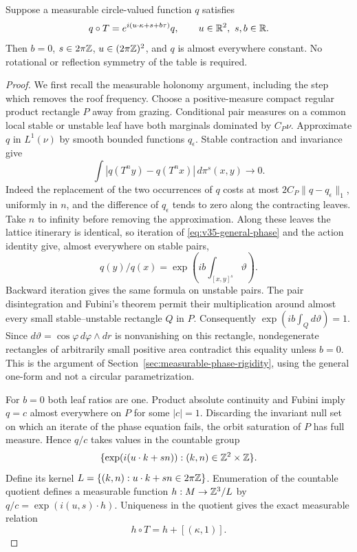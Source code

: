 \begin{theorem}
\label{thm:v35-rotation-free-rigidity}
Suppose a measurable circle-valued function $q$ satisfies
\begin{equation}\label{eq:v35-general-phase}
 q\circ T=e^{i(u\cdot\kappa+s+b\tau)}q,
       \qquad u\in\R^2,\ s,b\in\R.
\end{equation}
Then $b=0$, $s\in2\pi\mathbb Z$, $u\in(2\pi\mathbb Z)^2$, and $q$ is almost
everywhere constant. No rotational or reflection symmetry of the table
is required.
\end{theorem}
\begin{proof}
We first recall the measurable holonomy argument, including the step
which removes the roof frequency. Choose a positive-measure compact
regular product rectangle $P$ away from grazing. Conditional pair
measures on a common local stable or unstable leaf have both marginals
dominated by $C_P\nu$. Approximate $q$ in $L^1(\nu)$ by smooth bounded
functions $q_\epsilon$. Stable contraction and invariance give
\[
 \int |q(T^ny)-q(T^nx)|\,d\pi^s(x,y)\longrightarrow0.
\]
Indeed the replacement of the two occurrences of $q$ costs at most
$2C_P\|q-q_\epsilon\|_1$, uniformly in $n$, and the difference of
$q_\epsilon$ tends to zero along the contracting leaves. Take $n$ to
infinity before removing the approximation. Along these leaves the
lattice itinerary is identical, so iteration of
\eqref{eq:v35-general-phase} and the action identity give, almost
everywhere on stable pairs,
\[
 q(y)/q(x)=\exp\left(ib\int_{[x,y]^s}\vartheta\right).
\]
Backward iteration gives the same formula on unstable pairs.
The pair disintegration and Fubini's theorem permit their multiplication
around almost every small stable--unstable rectangle $Q$ in $P$.
Consequently $\exp(ib\int_Qd\vartheta)=1$.
Since $d\vartheta=\cos\varphi\,d\varphi\wedge dr$ is nonvanishing
on this rectangle, nondegenerate rectangles of arbitrarily small
positive area contradict this equality unless $b=0$. This is the
argument of Section~\ref{sec:measurable-phase-rigidity}, using the general
one-form and not a circular parametrization.

For $b=0$ both leaf ratios are one. Product absolute continuity and
Fubini imply $q=c$ almost everywhere on $P$ for some $|c|=1$.
Discarding the invariant null set on which an iterate of the phase
equation fails, the orbit saturation of $P$ has full measure. Hence
$q/c$ takes values in the countable group
\[
 \{\exp(i(u\cdot k+s n)):(k,n)\in\mathbb Z^2\times\mathbb Z\}.
\]
Define its kernel
$L=\{(k,n):u\cdot k+s n\in2\pi\mathbb Z\}$.
Enumeration of the countable quotient defines a measurable function
$h:M\to\mathbb Z^3/L$ by $q/c=\exp(i(u,s)\cdot h)$. Uniqueness in the
quotient gives the exact measurable relation
\begin{equation}\label{eq:v35-space-count-lift}
 h\circ T=h+[(\kappa,1)].
\end{equation}


\end{proof}

